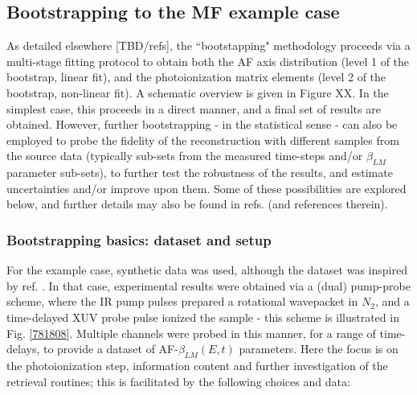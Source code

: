 \subsection{Bootstrapping to the MF example case}

As detailed elsewhere [TBD/refs], the ``bootstapping" methodology proceeds via a multi-stage fitting protocol to obtain both the AF axis distribution (level 1 of the bootstrap, linear fit), and the photoionization matrix elements (level 2 of the bootstrap, non-linear fit). A schematic overview is given in Figure XX. In the simplest case, this proceeds in a direct manner, and a final set of results are obtained. However, further bootstrapping - in the statistical sense - can also be employed to probe the fidelity of the reconstruction with different samples from the source data (typically sub-sets from the measured time-steps and/or $\beta_{LM}$ parameter sub-sets), to further test the robustness of the results, and estimate uncertainties and/or improve upon them. Some of these possibilities are explored below, and further details may also be found in refs. \cite{hockett2018QMP1,hockett2018QMP2,marceau2017MolecularFrameReconstruction} (and references therein).


\subsubsection{Bootstrapping basics: dataset and setup}

For the example case, synthetic data was used, although the dataset was inspired by ref. \cite{marceau2017MolecularFrameReconstruction}. In that case, experimental results were obtained via a (dual) pump-probe scheme, where the IR pump pulses prepared a rotational wavepacket in $N_2$, and a time-delayed XUV probe pulse ionized the sample - this scheme is illustrated in Fig. \ref{781808}. Multiple channels were probed in this manner, for a range of time-delays, to provide a dataset of AF-$\beta_{LM}(E,t)$ parameters. Here the focus is on the photoionization step, information content and further investigation of the retrieval routines; this is facilitated by the following choices and data:

